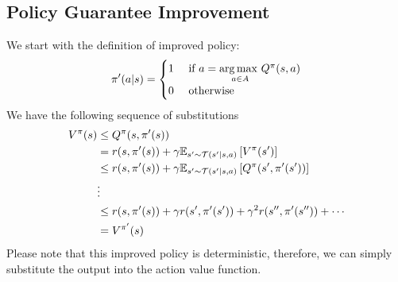 \subsection{Policy Guarantee Improvement}
\label{appx:chap2-rl-policy-improve} 
We start with the definition of improved policy:
\begin{equation*}
    \pi'(a | s) = \begin{cases}
        1 &\text{ if } a = \underset{a \in A}{\arg\max \ } Q^\pi(s, a) \\
        0 &\text{ otherwise }
    \end{cases}
\end{equation*}
We have the following sequence of substitutions
\begin{equation*}
    \begin{aligned}
        V^{\pi}(s) &\le Q^{\pi}(s, \pi'(s)) \\
        &= r(s, \pi'(s)) + \gamma \mathbb{E}_{s' \sim \mathcal{T}(s' | s, a)}\left[ V^\pi(s') \right]  \\
        &\le r(s, \pi'(s)) + \gamma \mathbb{E}_{s' \sim \mathcal{T}(s' | s, a)}\left[ Q^{\pi}(s', \pi'(s')) \right]  \\
        &\vdots \\
        &\le r(s, \pi'(s)) + \gamma  r(s', \pi'(s')) + \gamma^2  r(s'', \pi'(s'')) + \cdots \\
        &= V^{\pi'}(s)
    \end{aligned}
\end{equation*}
Please note that this improved policy is deterministic, therefore, we can simply substitute the output into the action value function.


